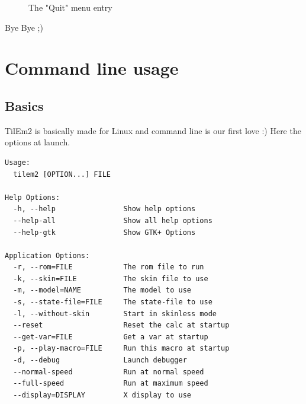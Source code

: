 \documentclass[10pt]{report}
\begin{document}
\begin{figure}[H]
\centering
{}
\caption{The "Quit" menu entry}
\end{figure}
Bye Bye ;)

\chapter{Command line usage}

\section{Basics}
TilEm2 is basically made for Linux and command line is our first love :)\newline
Here the options at launch.\newline
\begin{lstlisting}
Usage:
  tilem2 [OPTION...] FILE

Help Options:
  -h, --help                Show help options
  --help-all                Show all help options
  --help-gtk                Show GTK+ Options

Application Options:
  -r, --rom=FILE            The rom file to run
  -k, --skin=FILE           The skin file to use
  -m, --model=NAME          The model to use
  -s, --state-file=FILE     The state-file to use
  -l, --without-skin        Start in skinless mode
  --reset                   Reset the calc at startup
  --get-var=FILE            Get a var at startup
  -p, --play-macro=FILE     Run this macro at startup
  -d, --debug               Launch debugger
  --normal-speed            Run at normal speed
  --full-speed              Run at maximum speed
  --display=DISPLAY         X display to use
\end{lstlisting}
\end{document}
